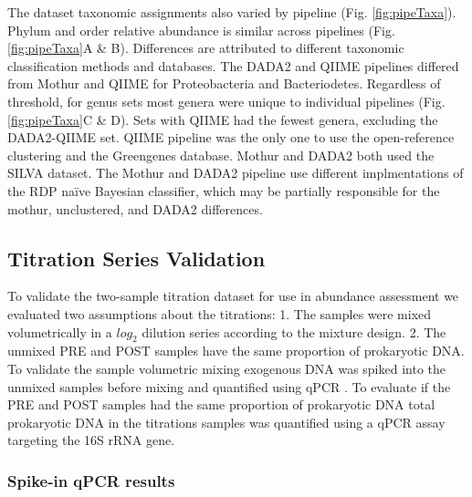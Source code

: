 \documentclass[smallextended]{svjour3}       %
\begin{document}
The dataset taxonomic assignments also varied by pipeline (Fig.
\ref{fig:pipeTaxa}). Phylum and order relative abundance is similar
across pipelines (Fig. \ref{fig:pipeTaxa}A \& B). Differences are
attributed to different taxonomic classification methods and databases.
The DADA2 and QIIME pipelines differed from Mothur and QIIME for
Proteobacteria and Bacteriodetes. Regardless of threshold, for genus
sets most genera were unique to individual pipelines (Fig.
\ref{fig:pipeTaxa}C \& D). Sets with QIIME had the fewest genera,
excluding the DADA2-QIIME set. QIIME pipeline was the only one to use
the open-reference clustering and the Greengenes database. Mothur and
DADA2 both used the SILVA dataset. The Mothur and DADA2 pipeline use
different implmentations of the RDP naïve Bayesian classifier, which may
be partially responsible for the mothur, unclustered, and DADA2
differences.

\hypertarget{titration-series-validation}{%
\subsection{Titration Series
Validation}\label{titration-series-validation}}

To validate the two-sample titration dataset for use in abundance
assessment we evaluated two assumptions about the titrations: 1. The
samples were mixed volumetrically in a \(log_2\) dilution series
according to the mixture design. 2. The unmixed PRE and POST samples
have the same proportion of prokaryotic DNA. To validate the sample
volumetric mixing exogenous DNA was spiked into the unmixed samples
before mixing and quantified using qPCR . To evaluate if the PRE and
POST samples had the same proportion of prokaryotic DNA total
prokaryotic DNA in the titrations samples was quantified using a qPCR
assay targeting the 16S rRNA gene.

\hypertarget{spike-in-qpcr-results}{%
\subsubsection{Spike-in qPCR results}\label{spike-in-qpcr-results}}
\end{document}
